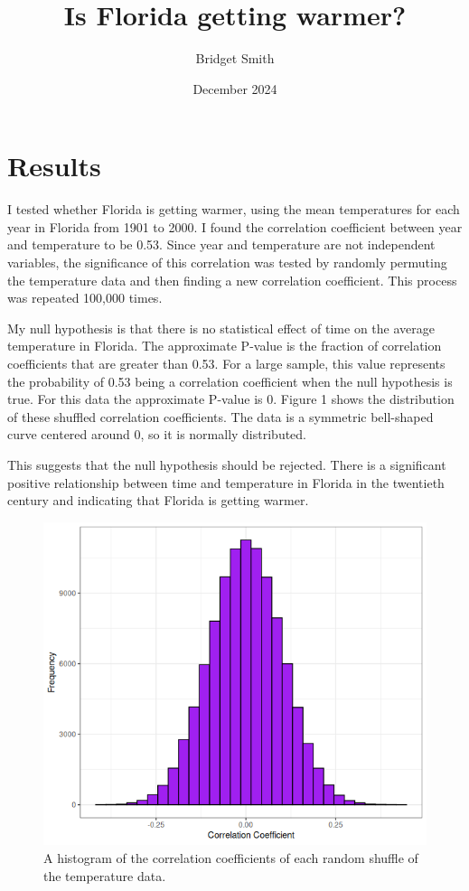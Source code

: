 \documentclass{article}
\title{Is Florida getting warmer?}
\author{Bridget Smith}
\date{December 2024}
\begin{document}
\maketitle

\section{Results}
I tested whether Florida is getting warmer, using the mean temperatures for each year in Florida from 1901 to 2000. I found the correlation coefficient between year and temperature to be 0.53. Since year and temperature are not independent variables, the significance of this correlation was tested by randomly permuting the temperature data and then finding a new correlation coefficient. This process was repeated 100,000 times. 

My null hypothesis is that there is no statistical effect of time on the average temperature in Florida. The approximate P-value is the fraction of correlation coefficients that are greater than 0.53. For a large sample, this value represents the probability of 0.53 being a correlation coefficient when the null hypothesis is true. For this data the approximate P-value is 0. Figure 1 shows the distribution of these shuffled correlation coefficients. The data is a symmetric bell-shaped curve centered around 0, so it is normally distributed.

This suggests that the null hypothesis should be rejected. There is a significant positive relationship between time and temperature in Florida in the twentieth century and indicating that Florida is getting warmer. 
\begin{figure}[h!]
    \centering
    \includegraphics[width=0.5\linewidth]{../data/Rplot.png}
    \caption{A histogram of the correlation coefficients of each random shuffle of the temperature data.}
    \label{fig:enter-label}
\end{figure}
\end{document}

